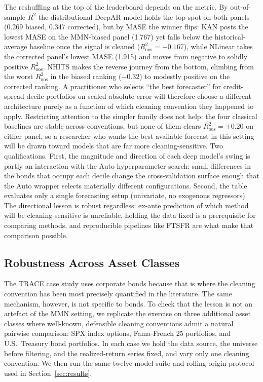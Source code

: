\documentclass{article}
\begin{document}
The reshuffling at the top of the leaderboard depends on the metric. By out-of-sample $R^2$ the distributional DeepAR model holds the top spot on both panels (0.269 biased, 0.347 corrected), but by MASE the winner flips: KAN posts the lowest MASE on the MMN-biased panel (1.767) yet falls below the historical-average baseline once the signal is cleaned ($R^2_{\text{oos}} = -0.167$), while NLinear takes the corrected panel's lowest MASE (1.915) and moves from negative to solidly positive $R^2_{\text{oos}}$. NHITS makes the reverse journey from the bottom, climbing from the worst $R^2_{\text{oos}}$ in the biased ranking ($-0.32$) to modestly positive on the corrected ranking. A practitioner who selects ``the best forecaster'' for credit-spread decile portfolios on scaled absolute error will therefore choose a different architecture purely as a function of which cleaning convention they happened to apply. Restricting attention to the simpler family does not help: the four classical baselines are stable across conventions, but none of them clears $R^2_{\text{oos}} = +0.20$ on either panel, so a researcher who wants the best available forecast in this setting will be drawn toward models that are far more cleaning-sensitive. Two qualifications. First, the magnitude and direction of each deep model's swing is partly an interaction with the Auto hyperparameter search: small differences in the bonds that occupy each decile change the cross-validation surface enough that the Auto wrapper selects materially different configurations. Second, the table evaluates only a single forecasting setup (univariate, no exogenous regressors). The directional lesson is robust regardless: ex-ante prediction of which method will be cleaning-sensitive is unreliable, holding the data fixed is a prerequisite for comparing methods, and reproducible pipelines like FTSFR are what make that comparison possible.

\subsection{Robustness Across Asset Classes}
\label{subsec:cleaning_robustness}

The TRACE case study uses corporate bonds because that is where the cleaning convention has been most precisely quantified in the literature. The same mechanism, however, is not specific to bonds. To check that the lesson is not an artefact of the MMN setting, we replicate the exercise on three additional asset classes where well-known, defensible cleaning conventions admit a natural pairwise comparison: SPX index options, Fama-French 25 portfolios, and U.S.\ Treasury bond portfolios. In each case we hold the data source, the universe before filtering, and the realized-return series fixed, and vary only one cleaning convention. We then run the same twelve-model suite and rolling-origin protocol used in Section~\ref{sec:results}.
\end{document}
